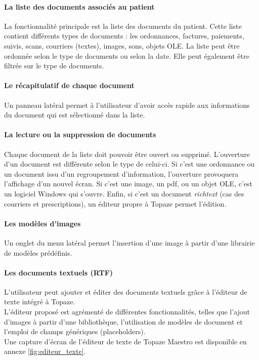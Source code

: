 \paragraph*{La liste des documents associés au patient\\}
La fonctionnalité principale est la liste des documents du patient. Cette liste contient différents types de documents : les ordonnances, factures, paiements, suivis, scans, courriers (textes), images, sons, objets \gls{OLE}. La liste peut être ordonnée selon le type de documents ou selon la date. Elle peut également être filtrée sur le type de documents.

\paragraph*{Le récapitulatif de chaque document\\}
Un panneau latéral permet à l'utilisateur d'avoir accès rapide aux informations du document qui est sélectionné dans la liste.

\paragraph*{La lecture ou la suppression de documents\\}
Chaque document de la liste doit pouvoir être ouvert ou supprimé.
L'ouverture d'un document est différente selon le type de celui-ci. Si c'est une ordonnance ou un document issu d'un regroupement d'information, l'ouverture provoquera l'affichage d'un nouvel écran. Si c'est une image, un pdf, ou un objet OLE, c'est un logiciel Windows qui s'ouvre. Enfin, si c'est un document \textit{richtext} (cas des courriers et prescriptions), un éditeur propre à Topaze permet l'édition. 

\paragraph*{Les modèles d'images\\}
Un onglet du menu latéral permet l'insertion d'une image à partir d'une librairie de modèles prédéfinis.

\paragraph*{Les documents textuels (\gls{RTF})\\}
L'utilisateur peut ajouter et éditer des documents textuels grâce à l'éditeur de texte intégré à Topaze. \\
L'éditeur proposé est agrémenté de différentes fonctionnalités, telles que l'ajout d'images à partir d'une bibliothèque, l'utilisation de modèles de document et l'emploi de champs génériques (placeholders).\\
Une capture d'écran de l'éditeur de texte de Topaze Maestro est disponible en annexe \ref{fig:editeur_texte}.

